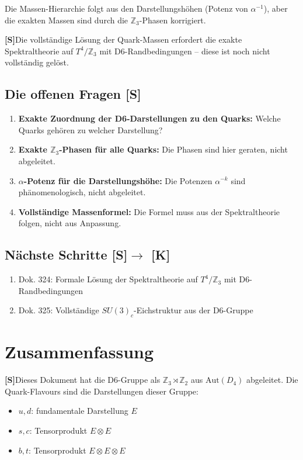 \documentclass[11pt,a4paper]{article}
\newcommand{\Kstatus}{\textbf{[K]}}
\newcommand{\Sstatus}{\textbf{[S]}}
\begin{document}
	Die Massen-Hierarchie folgt aus den Darstellungshöhen (Potenz von $\alpha^{-1}$), aber die exakten Massen sind durch die $\mathbb{Z}_3$-Phasen korrigiert.
	
	\Sstatus Die vollständige Lösung der Quark-Massen erfordert die exakte Spektraltheorie auf $T^4/\mathbb{Z}_3$ mit D6-Randbedingungen -- diese ist noch nicht vollständig gelöst.
	
	\subsection{Die offenen Fragen \Sstatus}
	
	\begin{enumerate}
		\item \textbf{Exakte Zuordnung der D6-Darstellungen zu den Quarks:} Welche Quarks gehören zu welcher Darstellung?
		\item \textbf{Exakte $\mathbb{Z}_3$-Phasen für alle Quarks:} Die Phasen sind hier geraten, nicht abgeleitet.
		\item \textbf{$\alpha$-Potenz für die Darstellungshöhe:} Die Potenzen $\alpha^{-k}$ sind phänomenologisch, nicht abgeleitet.
		\item \textbf{Vollständige Massenformel:} Die Formel muss aus der Spektraltheorie folgen, nicht aus Anpassung.
	\end{enumerate}
	
	\subsection{Nächste Schritte \Sstatus $\to$ \Kstatus}
	
	\begin{enumerate}
		\item Dok. 324: Formale Lösung der Spektraltheorie auf $T^4/\mathbb{Z}_3$ mit D6-Randbedingungen
		\item Dok. 325: Vollständige $SU(3)_c$-Eichstruktur aus der D6-Gruppe
	\end{enumerate}
	
	\section{Zusammenfassung}
	
	\Sstatus Dieses Dokument hat die D6-Gruppe als $\mathbb{Z}_3 \rtimes \mathbb{Z}_2$ aus $\text{Aut}(D_4)$ abgeleitet. Die Quark-Flavours sind die Darstellungen dieser Gruppe:
	
	\begin{itemize}
		\item $u, d$: fundamentale Darstellung $E$
		\item $s, c$: Tensorprodukt $E \otimes E$
		\item $b, t$: Tensorprodukt $E \otimes E \otimes E$
	\end{itemize}
	
\end{document}
